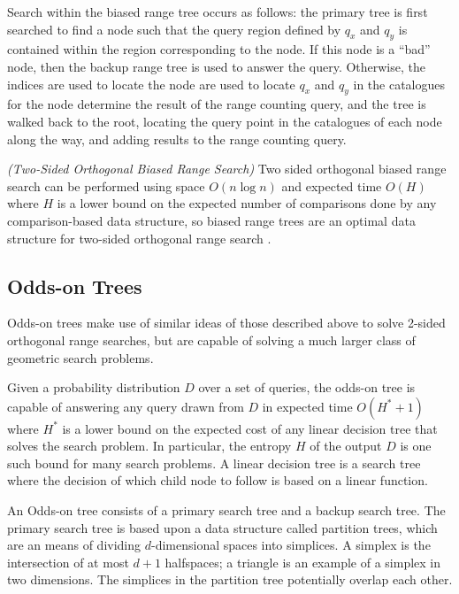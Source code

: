 \documentclass[mcs]{scsthesis}
\begin{document}
Search within the biased range tree occurs as follows: the primary tree is
first searched to find a node such that the query region defined by \(q_x\) and
\(q_y\) is contained within the region corresponding to the node. If this node
is a ``bad'' node, then the backup range tree is used to answer the query.
Otherwise, the indices are used to locate the node are used to locate \(q_x\)
and \(q_y\) in the catalogues for the node determine the result of the range
counting query, and the tree is walked back to the root, locating the query
point in the catalogues of each node along the way, and adding results to
the range counting query.

\begin{thm} \emph{(Two-Sided Orthogonal Biased Range Search)} 
Two sided orthogonal biased range search can be performed using space
\(O(n \log n)\) and expected time \(O(H)\) where \(H\) is a lower bound on the
expected number of comparisons done by any comparison-based data structure, so
biased range trees are an optimal data structure for two-sided orthogonal
range search \cite{biasedrange}.
\end{thm}

\subsection{Odds-on Trees}

Odds-on trees make use of similar ideas of those described above to solve
2-sided orthogonal range searches, but are capable of solving a much larger
class of geometric search problems.

Given a probability distribution \(D\) over a set of queries, the odds-on tree
is capable of answering any query drawn from \(D\) in expected time
\(O(H^* + 1)\) where \(H^*\) is a lower bound on the expected cost of any
linear decision tree that solves the search problem. In particular, the
entropy \(H\) of the output \(D\) is one such bound for many search
problems. A linear decision tree is a search tree where the decision of which
child node to follow is based on a linear function.

An Odds-on tree consists of a primary search tree and a backup search tree.
The primary search tree is based upon a data structure called partition trees,
which are an means of dividing \(d\)-dimensional spaces into simplices. A
simplex is the intersection of at most \(d + 1\) halfspaces; a triangle is an
example of a simplex in two dimensions. The simplices in the partition tree
potentially overlap each other.
\end{document}
